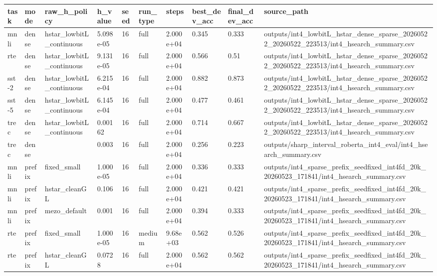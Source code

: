 \begin{table}[t]
\centering
\small
\begin{tabular}{llllllllll}
\toprule
task & mode & raw\_h\_policy & h\_value & seed & run\_type & steps & best\_dev\_acc & final\_dev\_acc & source\_path \\
\midrule
mnli & dense & hstar\_lowbitL\_continuous & 5.098e-05 & 16 & full & 2.000e+04 & 0.345 & 0.333 & outputs/int4\_lowbitL\_hstar\_dense\_sparse\_20260522\_20260522\_223513/int4\_hsearch\_summary.csv \\
rte & dense & hstar\_lowbitL\_continuous & 9.131e-05 & 16 & full & 2.000e+04 & 0.566 & 0.51 & outputs/int4\_lowbitL\_hstar\_dense\_sparse\_20260522\_20260522\_223513/int4\_hsearch\_summary.csv \\
sst-2 & dense & hstar\_lowbitL\_continuous & 6.215e-04 & 16 & full & 2.000e+04 & 0.882 & 0.873 & outputs/int4\_lowbitL\_hstar\_dense\_sparse\_20260522\_20260522\_223513/int4\_hsearch\_summary.csv \\
sst-5 & dense & hstar\_lowbitL\_continuous & 6.145e-04 & 16 & full & 2.000e+04 & 0.477 & 0.461 & outputs/int4\_lowbitL\_hstar\_dense\_sparse\_20260522\_20260522\_223513/int4\_hsearch\_summary.csv \\
trec & dense & hstar\_lowbitL\_continuous & 0.00162 & 16 & full & 2.000e+04 & 0.714 & 0.667 & outputs/int4\_lowbitL\_hstar\_dense\_sparse\_20260522\_20260522\_223513/int4\_hsearch\_summary.csv \\
trec & dense &  & 0.003 & 16 & full & 2.000e+04 & 0.256 & 0.223 & outputs/sharp\_interval\_roberta\_int4\_eval/int4\_hsearch\_summary.csv \\
mnli & prefix & fixed\_small & 1.000e-05 & 16 & full & 2.000e+04 & 0.336 & 0.333 & outputs/int4\_sparse\_prefix\_seedfixed\_int4fd\_20k\_20260523\_171841/int4\_hsearch\_summary.csv \\
mnli & prefix & hstar\_cleanGL & 0.106 & 16 & full & 2.000e+04 & 0.421 & 0.421 & outputs/int4\_sparse\_prefix\_seedfixed\_int4fd\_20k\_20260523\_171841/int4\_hsearch\_summary.csv \\
mnli & prefix & mezo\_default & 0.001 & 16 & full & 2.000e+04 & 0.394 & 0.333 & outputs/int4\_sparse\_prefix\_seedfixed\_int4fd\_20k\_20260523\_171841/int4\_hsearch\_summary.csv \\
rte & prefix & fixed\_small & 1.000e-05 & 16 & medium & 9.68e+03 & 0.562 & 0.526 & outputs/int4\_sparse\_prefix\_seedfixed\_int4fd\_20k\_20260523\_171841/int4\_hsearch\_summary.csv \\
rte & prefix & hstar\_cleanGL & 0.0728 & 16 & full & 2.000e+04 & 0.562 & 0.562 & outputs/int4\_sparse\_prefix\_seedfixed\_int4fd\_20k\_20260523\_171841/int4\_hsearch\_summary.csv \\

\end{tabular}
\end{table}
